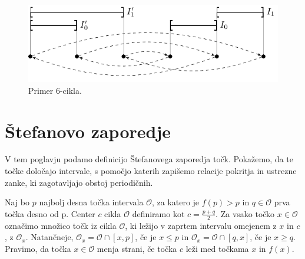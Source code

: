 \documentclass[mat2]{fmfdelo}
\begin{document}
\begin{primer}[6-cikel]
\begin{figure}[h]
  \centering
  \includegraphics{images/sestcikel.pdf}
  \caption[Primer vektorske slike.]{Primer 6-cikla.}
  \label{fig:6cikel}
\end{figure}
\end{primer}

\section{Štefanovo zaporedje} \label{stefan_zap} 
V tem poglavju podamo definicijo Štefanovega zaporedja točk. Pokažemo, da te točke določajo intervale, s pomočjo katerih zapišemo relacije pokritja in ustrezne zanke, ki zagotavljajo obstoj periodičnih.
\begin{definicija}
Naj bo $p$ najbolj desna točka intervala $\mathcal{O}$, za katero je $f(p) > p$ in $q\in \mathcal{O}$ prva točka desno od p. Center $c$ cikla $\mathcal{O}$ definiramo kot $c=\frac{p+q}{2}$. Za vsako točko $x \in \mathcal{O}$ označimo množico točk iz cikla $\mathcal{O}$, ki ležijo v zaprtem intervalu omejenem z $x$ in $c$, z $\mathcal{O}_x$. Natančneje, $\mathcal{O}_x = \mathcal{O} \cap [x, p]$, če je $x \leq p$ in  $\mathcal{O}_x = \mathcal{O} \cap [q, x]$, če je $x \geq q$. Pravimo, da točka $x \in \mathcal{O}$ menja strani, če točka $c$ leži med točkama $x$ in $f(x)$.
\end{definicija}
\end{document}

